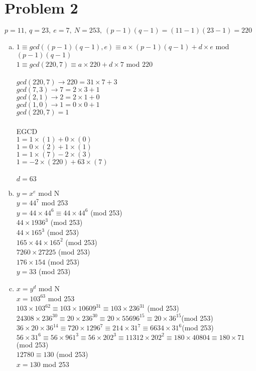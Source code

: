 \documentclass[11pt,letterpaper]{article}
\begin{document}
\section*{Problem 2}
$p=11,~q=23,~e=7,~N=253,~(p-1)(q-1)=(11-1)(23-1)=220$\\
\begin{enumerate}[(a)]
\item
$1\equiv gcd((p-1)(q-1),e)\equiv a\times (p-1)(q-1) + d\times e$ mod $(p-1)(q-1)$\\
$1\equiv gcd(220,7)\equiv a\times 220 + d\times 7$ mod $220$\\
\\
$gcd(220,7)\rightarrow 220 = 31\times7 + 3$\\
$gcd(7,3)\rightarrow 7= 2\times3 + 1$\\
$gcd(2,1)\rightarrow 2 = 2\times1 + 0$\\
$gcd(1,0)\rightarrow 1= 0\times0 + 1$\\
$gcd(220,7)=1$\\
\\
EGCD\\
$1 = 1\times(1) + 0\times(0)$\\
$1 = 0\times(2) + 1\times(1)$\\
$1 = 1\times(7) - 2\times(3)$\\
$1 = -2\times(220) + 63\times(7)$\\
\\
$d = 63$\\
\item
$y=x^{e}$ mod N\\
$y=44^{7}$ mod 253\\
$y=44\times44^{6} \equiv 44\times44^{6}$ (mod 253)\\
$44\times1936^{3}$ (mod 253)\\
$44\times165^{3}$ (mod 253)\\
$165\times44\times165^{2}$ (mod 253)\\
$7260\times27225$ (mod 253)\\
$176\times154$ (mod 253)\\
$y=33$ (mod 253)
\item
$x=y^{d}$ mod N\\
$x = 103^{63}$ mod 253\\
$103\times103^{62}\equiv 103\times10609^{31} \equiv 103\times236^{31}$ (mod 253)\\
$24308\times236^{30} \equiv  20\times 236^{30} \equiv 20\times55696^{15} \equiv 20\times 36^{15}$(mod 253)\\
$36\times20\times36^{14} \equiv 720\times1296^{7} \equiv 214\times 31^{7} \equiv 6634\times31^{6}$(mod 253)\\
$56\times31^{6}\equiv 56\times 961^{3}\equiv 56\times202^{3}\equiv
11312\times202^2\equiv 180\times40804\equiv 180\times71$ (mod 253)\\
$12780\equiv 130$ (mod 253)\\
$x = 130$ mod 253
\end{enumerate}
\clearpage
\end{document}
